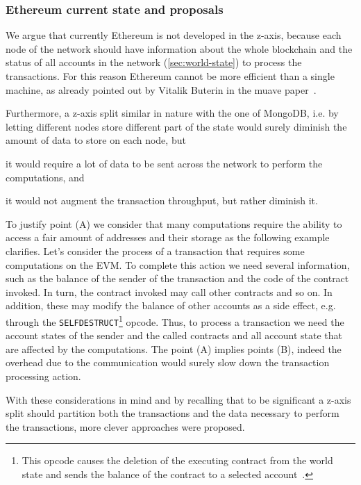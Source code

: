 \subsubsection{Ethereum current state and proposals}
We argue that currently Ethereum is not developed in the z-axis, because each
node of the network should have information about the whole blockchain and the
status of all accounts in the network (\autoref{sec:world-state}) to process the
transactions. For this reason Ethereum cannot be more efficient than a single
machine, as already pointed out by Vitalik Buterin in the muave
paper~\cite{bib:mauve}.

Furthermore, a z-axis split similar in nature with the one of MongoDB, i.e. by
letting different nodes store different part of the state would surely diminish
the amount of data to store on each node, but
\begin{enumerate*}[label=(\Alph*)]
  \item it would require a lot of data to be sent across the network to perform
  the computations, and
  \item it would not augment the transaction throughput, but rather diminish it.
\end{enumerate*}
To justify point (A) we consider that many computations require the ability to
access a fair amount of addresses and their storage as the following example
clarifies. Let's consider the process of a transaction that requires some
computations on the EVM. To complete this action we need several information,
such as the balance of the sender of the transaction and the code of the
contract invoked. In turn, the contract invoked may call other contracts and so
on. In addition, these may modify the balance of other accounts as a side
effect, e.g. through the \texttt{SELFDESTRUCT}\footnote{This opcode causes the
deletion of the executing contract from the world state and sends the balance of
the contract to a selected account~\cite{wood2018ethereum}.} opcode. Thus, to
process a transaction we need the account states of the sender and the called
contracts and all account state that are affected by the computations. The point
(A) implies points (B), indeed the overhead due to the communication would
surely slow down the transaction processing action.

With these considerations in mind and by recalling that to be significant a
z-axis split should partition both the transactions and the data necessary to
perform the transactions, more clever approaches were proposed.

